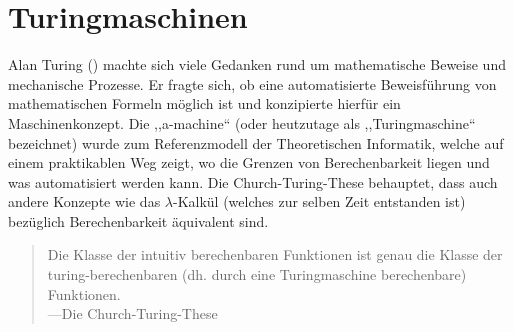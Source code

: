 \chapter{Turingmaschinen}
\newcommand{\blank}{b}
%
Alan Turing () machte sich viele Gedanken rund um mathematische Beweise und mechanische Prozesse. Er fragte sich, ob eine automatisierte Beweisführung von mathematischen Formeln möglich ist und konzipierte hierfür ein Maschinenkonzept. Die ,,a-machine`` (oder heutzutage als ,,Turingmaschine`` bezeichnet) wurde zum Referenzmodell der Theoretischen Informatik, welche auf einem praktikablen Weg zeigt, wo die Grenzen von Berechenbarkeit liegen und was automatisiert werden kann. Die Church-Turing-These behauptet, dass auch andere Konzepte wie das $\lambda$-Kalkül (welches zur selben Zeit entstanden ist) bezüglich Berechenbarkeit äquivalent sind.

\begin{quotation}
 Die Klasse der intuitiv berechenbaren Funktionen ist genau die Klasse der turing-berechenbaren (dh. durch eine Turingmaschine berechenbare) Funktionen. \\
 ---Die Church-Turing-These
\end{quotation}
%
